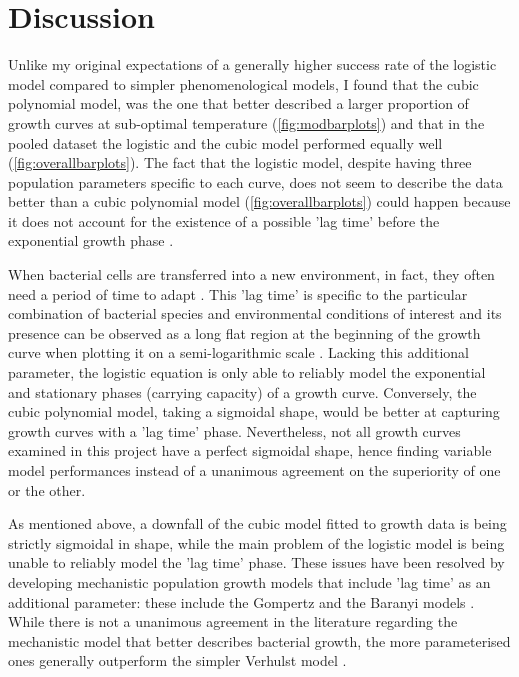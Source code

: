 \documentclass[a4paper]{article}
\begin{document}
\section{Discussion}
Unlike my original expectations of a generally higher success rate of the logistic model compared to simpler phenomenological models, I found that the cubic polynomial model, was the one that better described a larger proportion of growth curves at sub-optimal temperature (\ref{fig:modbarplots}) and that in the pooled dataset the logistic and the cubic model performed equally well (\ref{fig:overallbarplots}). 
The fact that the logistic model, despite having three population parameters specific to each curve, does not seem to describe the data better than a cubic polynomial model (\ref{fig:overallbarplots}) could happen because it does not account for the existence of a possible 'lag time' before the exponential growth phase \citep{PELEG2007808, BUCHANAN1997313, doi:10.1080/10408398.2011.570463}. \par

When bacterial cells are transferred into a new environment, in fact, they often need a period of time to adapt \citep{BUCHANAN1997313}. This 'lag time' is specific to the particular combination of bacterial species and environmental conditions of interest and its presence can be observed as a long flat region at the beginning of the growth curve when plotting it on a semi-logarithmic scale \citep{BUCHANAN1997313, doi:10.1080/10408398.2011.570463}. Lacking this additional parameter, the logistic equation is only able to reliably model the exponential and stationary phases (carrying capacity) of a growth curve. Conversely, the cubic polynomial model, taking a sigmoidal shape, would be better at capturing growth curves with a 'lag time' phase. Nevertheless, not all growth curves examined in this project have a perfect sigmoidal shape, hence finding variable model performances instead of a unanimous agreement on the superiority of one or the other.\par

As mentioned above, a downfall of the cubic model fitted to growth data is being strictly sigmoidal in shape, while the main problem of the logistic model is being unable to reliably model the 'lag time' phase. These issues have been resolved by developing mechanistic population growth models that include 'lag time' as an additional parameter: these include the Gompertz and the Baranyi models \citep{BUCHANAN1997313, baranyi1993non}. While there is not a unanimous agreement in the literature regarding the mechanistic model that better describes bacterial growth, the more parameterised ones generally outperform the simpler Verhulst model \citep{zwietering1994modeling, BUCHANAN1997313, pla2015comparison}.\par 
\end{document}
